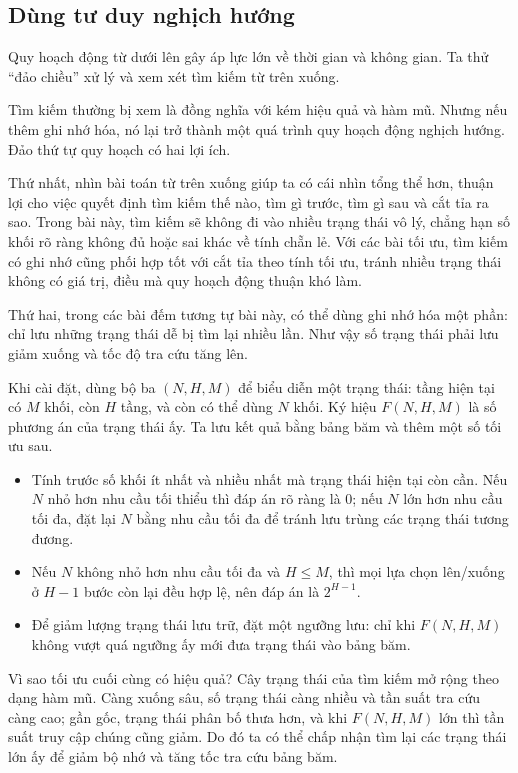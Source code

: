 \documentclass[11pt]{article}
\begin{document}
\subsection{Dùng tư duy nghịch hướng}

Quy hoạch động từ dưới lên gây áp lực lớn về thời gian và không gian. Ta thử
``đảo chiều'' xử lý và xem xét tìm kiếm từ trên xuống.

Tìm kiếm thường bị xem là đồng nghĩa với kém hiệu quả và hàm mũ. Nhưng nếu
thêm ghi nhớ hóa, nó lại trở thành một quá trình quy hoạch động nghịch hướng.
Đảo thứ tự quy hoạch có hai lợi ích.

Thứ nhất, nhìn bài toán từ trên xuống giúp ta có cái nhìn tổng thể hơn, thuận
lợi cho việc quyết định tìm kiếm thế nào, tìm gì trước, tìm gì sau và cắt
tỉa ra sao. Trong bài này, tìm kiếm sẽ không đi vào nhiều trạng thái vô lý,
chẳng hạn số khối rõ ràng không đủ hoặc sai khác về tính chẵn lẻ. Với các bài
tối ưu, tìm kiếm có ghi nhớ cũng phối hợp tốt với cắt tỉa theo tính tối ưu,
tránh nhiều trạng thái không có giá trị, điều mà quy hoạch động thuận khó làm.

Thứ hai, trong các bài đếm tương tự bài này, có thể dùng ghi nhớ hóa một phần:
chỉ lưu những trạng thái dễ bị tìm lại nhiều lần. Như vậy số trạng thái phải
lưu giảm xuống và tốc độ tra cứu tăng lên.

Khi cài đặt, dùng bộ ba $(N,H,M)$ để biểu diễn một trạng thái: tầng hiện tại
có $M$ khối, còn $H$ tầng, và còn có thể dùng $N$ khối. Ký hiệu
$F(N,H,M)$ là số phương án của trạng thái ấy. Ta lưu kết quả bằng bảng băm và
thêm một số tối ưu sau.

\begin{itemize}
  \item Tính trước số khối ít nhất và nhiều nhất mà trạng thái hiện tại còn
  cần. Nếu $N$ nhỏ hơn nhu cầu tối thiểu thì đáp án rõ ràng là $0$; nếu $N$
  lớn hơn nhu cầu tối đa, đặt lại $N$ bằng nhu cầu tối đa để tránh lưu trùng
  các trạng thái tương đương.
  \item Nếu $N$ không nhỏ hơn nhu cầu tối đa và $H\le M$, thì mọi lựa chọn
  lên/xuống ở $H-1$ bước còn lại đều hợp lệ, nên đáp án là $2^{H-1}$.
  \item Để giảm lượng trạng thái lưu trữ, đặt một ngưỡng lưu: chỉ khi
  $F(N,H,M)$ không vượt quá ngưỡng ấy mới đưa trạng thái vào bảng băm.
\end{itemize}

Vì sao tối ưu cuối cùng có hiệu quả? Cây trạng thái của tìm kiếm mở rộng theo
dạng hàm mũ. Càng xuống sâu, số trạng thái càng nhiều và tần suất tra cứu
càng cao; gần gốc, trạng thái phân bố thưa hơn, và khi $F(N,H,M)$ lớn thì tần
suất truy cập chúng cũng giảm. Do đó ta có thể chấp nhận tìm lại các trạng
thái lớn ấy để giảm bộ nhớ và tăng tốc tra cứu bảng băm.
\end{document}
